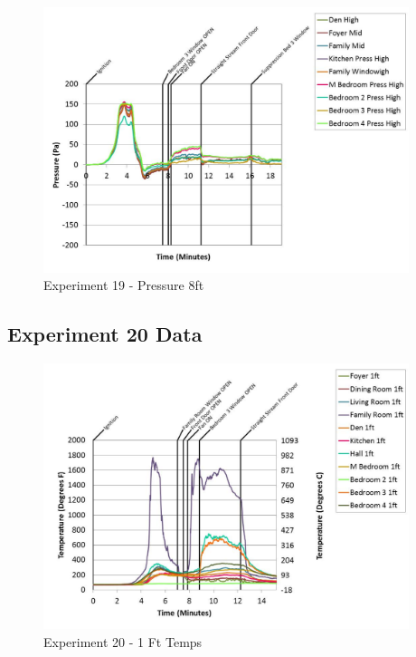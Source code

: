 \documentclass{article}
\begin{document}
\begin{appendices}
	\begin{figure}[h!]
		\centering
		\includegraphics[height=3.05in]{0_Images/Results_Charts/Exp_19_Charts/Pressure8ft.pdf}
		\caption{Experiment 19 - Pressure 8ft}
	\end{figure}
 
	\clearpage

		\clearpage
\clearpage		\large
\subsection{Experiment 20 Data} \label{App:Exp20Results} 

	\begin{figure}[h!]
		\centering
		\includegraphics[height=3.05in]{0_Images/Results_Charts/Exp_20_Charts/1FtTemps.pdf}
		\caption{Experiment 20 - 1 Ft Temps}
	\end{figure}
 


\end{appendices}
\end{document}
